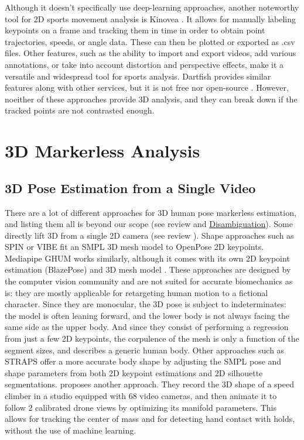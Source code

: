 Although it doesn't specifically use deep-learning approaches, another noteworthy tool for 2D sports movement analysis is Kinovea \cite{Kinovea,Fernandez2020}. It allows for manually labeling keypoints on a frame and tracking them in time in order to obtain point trajectories, speeds, or angle data. These can then be plotted or exported as .csv files. Other features, such as the ability to import and export videos, add various annotations, or take into account distortion and perspective effects, make it a versatile and widespread tool for sports analysis. Dartfish provides similar features along with other services, but it is not free nor open-source \cite{Dartfish}. However, noeither of these approaches provide 3D analysis, and they can break down if the tracked points are not contrasted enough. 

\FloatBarrier
\section{3D Markerless Analysis} 
\subsection{3D Pose Estimation from a Single Video}

There are a lot of different approaches for 3D human pose markerless estimation, and listing them all is beyond our scope (see review \cite{Wang2021a} and \hyperlink{Ann:gloss}{Disambiguation}). Some directly lift 3D from a single 2D camera (see review \cite{Liu2022b}). Shape approaches such as SPIN \cite{Kolotouros2019} or VIBE \cite{Kocabas2020} fit an SMPL 3D mesh model \cite{Loper2015} to OpenPose 2D keypoints. Mediapipe GHUM works similarly, although it comes with its own 2D keypoint estimation (BlazePose) and 3D mesh model \cite{Xu2020b}. These approaches are designed by the computer vision community and are not suited for accurate biomechanics as is: they are mostly applicable for retargeting human motion to a fictional character. Since they are monocular, the 3D pose is subject to indeterminates: the model is often leaning forward, and the lower body is not always facing the same side as the upper body. And since they consist of performing a regression from just a few 2D keypoints, the corpulence of the mesh is only a function of the segment sizes, and describes a generic human body. Other approaches such as STRAPS \cite{Sengupta2020} offer a more accurate body shape by adjusting the SMPL pose and shape parameters from both 2D keypoint estimations and 2D silhouette segmentations. \cite{Reveret2020} proposes another approach. They record the 3D shape of a speed climber in a studio equipped with 68 video cameras, and then animate it to follow 2 calibrated drone views by optimizing its manifold parameters. This allows for tracking the center of mass and for detecting hand contact with holds, without the use of machine learning. 

